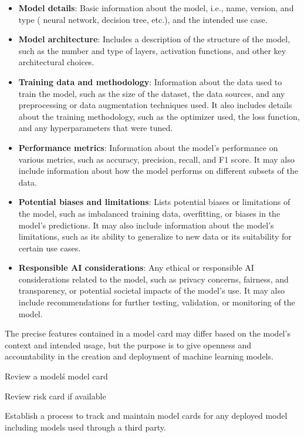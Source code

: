 \begin{itemize}
  \item \textbf{Model details}: Basic information about the model, i.e., name, version, and type ( neural network, decision tree, etc.), and the intended use case.
  \item \textbf{Model architecture}: Includes a description of the structure of the model, such as the number and type of layers, activation functions, and other key architectural choices.
  \item \textbf{Training data and methodology}: Information about the data used to train the model, such as the size of the dataset, the data sources, and any preprocessing or data augmentation techniques used. It also includes details about the training methodology, such as the optimizer used, the loss function, and any hyperparameters that were tuned.
  \item \textbf{Performance metrics}: Information about the model's performance on various metrics, such as accuracy, precision, recall, and F1 score. It may also include information about how the model performs on different subsets of the data.
  \item \textbf{Potential biases and limitations}: Lists potential biases or limitations of the model, such as imbalanced training data, overfitting, or biases in the model's predictions. It may also include information about the model's limitations, such as its ability to generalize to new data or its suitability for certain use cases.
  \item \textbf{Responsible AI considerations}:  Any ethical or responsible AI considerations related to the model, such as privacy concerns, fairness, and transparency, or potential societal impacts of the model's use. It may also include recommendations for further testing, validation, or monitoring of the model.
\end{itemize}

\clearpage

The precise features contained in a model card may differ based on the model's context and intended usage, but the purpose is to give openness and accountability in the creation and deployment of machine learning models.

\begin{minipage}{\linewidth}
\begin{checklist}
  \item Review a model\'s model card
  \item Review risk card if available
  \item Establish a process to track and maintain model cards for any deployed model including models used through a third party.
\end{checklist}
\end{minipage}

